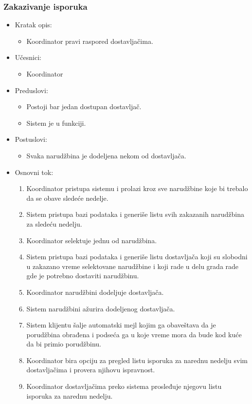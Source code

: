 
\subsubsection{Zakazivanje isporuka}

\begin{itemize}
	\item Kratak opis:
		\begin{itemize}
			\item Koordinator pravi raspored dostavljačima.
		\end{itemize}
	\item Učesnici:
		\begin{itemize}
		    \item Koordinator
		\end{itemize}
	\item Preduslovi:
		\begin{itemize}
		    \item Postoji bar jedan dostupan dostavljač.
		    \item Sistem je u funkciji.
		\end{itemize}
	\item Postuslovi:
		\begin{itemize}
			\item Svaka narudžbina je dodeljena nekom od dostavljača.
	\end{itemize}
	\item Osnovni tok:
		\begin{enumerate}
            \item Koordinator pristupa sistemu i prolazi kroz sve narudžbine koje bi trebalo da se obave sledeće nedelje.
            \item Sistem pristupa bazi podataka i generiše listu svih zakazanih narudžbina za sledeću nedelju.
            \item Koordinator selektuje jednu od narudžbina.
            \item Sistem pristupa bazi podataka i generiše listu dostavljača koji su slobodni u zakazano vreme selektovane narudžbine i koji rade u delu grada rade gde je potrebno dostaviti narudžbinu.
           \item Koordinator narudžbini dodeljuje dostavljača.
           \item Sistem narudžbini ažurira dodeljenog dostavljača.
            \item Sistem klijentu šalje automatski mejl kojim ga obaveštava da je porudžbina obrađena i podseća  ga u koje vreme mora da bude kod kuće da bi primio porudžbinu.
           \item Koordinator bira opciju za pregled listu isporuka za narednu nedelju svim dostavljačima i provera njihovu ispravnost.
            \item Koordinator dostavljačima preko sistema prosleđuje njegovu listu isporuka za narednu nedelju.


\end{enumerate}
\end{itemize}
